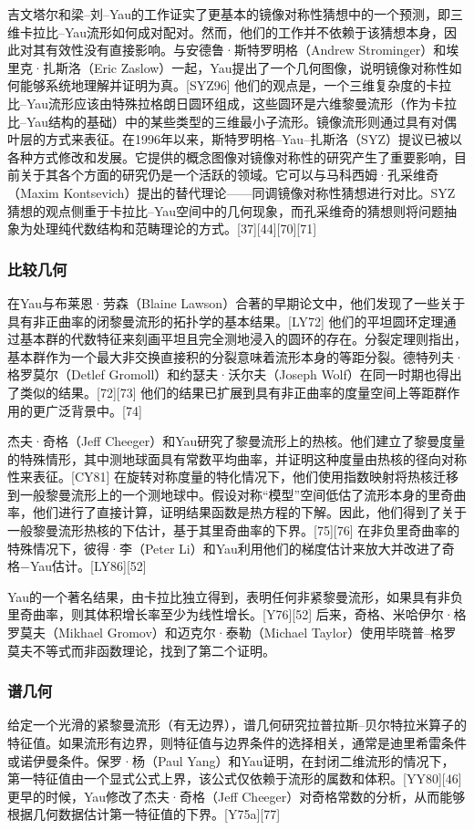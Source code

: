 吉文塔尔和梁–刘–Yau的工作证实了更基本的镜像对称性猜想中的一个预测，即三维卡拉比–Yau流形如何成对配对。然而，他们的工作并不依赖于该猜想本身，因此对其有效性没有直接影响。与安德鲁·斯特罗明格（Andrew Strominger）和埃里克·扎斯洛（Eric Zaslow）一起，Yau提出了一个几何图像，说明镜像对称性如何能够系统地理解并证明为真。[SYZ96] 他们的观点是，一个三维复杂度的卡拉比–Yau流形应该由特殊拉格朗日圆环组成，这些圆环是六维黎曼流形（作为卡拉比–Yau结构的基础）中的某些类型的三维最小子流形。镜像流形则通过具有对偶叶层的方式来表征。在1996年以来，斯特罗明格–Yau–扎斯洛（SYZ）提议已被以各种方式修改和发展。它提供的概念图像对镜像对称性的研究产生了重要影响，目前关于其各个方面的研究仍是一个活跃的领域。它可以与马科西姆·孔采维奇（Maxim Kontsevich）提出的替代理论——同调镜像对称性猜想进行对比。SYZ猜想的观点侧重于卡拉比–Yau空间中的几何现象，而孔采维奇的猜想则将问题抽象为处理纯代数结构和范畴理论的方式。[37][44][70][71]
\subsubsection{比较几何}
在Yau与布莱恩·劳森（Blaine Lawson）合著的早期论文中，他们发现了一些关于具有非正曲率的闭黎曼流形的拓扑学的基本结果。[LY72] 他们的平坦圆环定理通过基本群的代数特征来刻画平坦且完全测地浸入的圆环的存在。分裂定理则指出，基本群作为一个最大非交换直接积的分裂意味着流形本身的等距分裂。德特列夫·格罗莫尔（Detlef Gromoll）和约瑟夫·沃尔夫（Joseph Wolf）在同一时期也得出了类似的结果。[72][73] 他们的结果已扩展到具有非正曲率的度量空间上等距群作用的更广泛背景中。[74]

杰夫·奇格（Jeff Cheeger）和Yau研究了黎曼流形上的热核。他们建立了黎曼度量的特殊情形，其中测地球面具有常数平均曲率，并证明这种度量由热核的径向对称性来表征。[CY81] 在旋转对称度量的特化情况下，他们使用指数映射将热核迁移到一般黎曼流形上的一个测地球中。假设对称“模型”空间低估了流形本身的里奇曲率，他们进行了直接计算，证明结果函数是热方程的下解。因此，他们得到了关于一般黎曼流形热核的下估计，基于其里奇曲率的下界。[75][76] 在非负里奇曲率的特殊情况下，彼得·李（Peter Li）和Yau利用他们的梯度估计来放大并改进了奇格−Yau估计。[LY86][52]

Yau的一个著名结果，由卡拉比独立得到，表明任何非紧黎曼流形，如果具有非负里奇曲率，则其体积增长率至少为线性增长。[Y76][52] 后来，奇格、米哈伊尔·格罗莫夫（Mikhael Gromov）和迈克尔·泰勒（Michael Taylor）使用毕晓普–格罗莫夫不等式而非函数理论，找到了第二个证明。
\subsubsection{谱几何}
给定一个光滑的紧黎曼流形（有无边界），谱几何研究拉普拉斯–贝尔特拉米算子的特征值。如果流形有边界，则特征值与边界条件的选择相关，通常是迪里希雷条件或诺伊曼条件。保罗·杨（Paul Yang）和Yau证明，在封闭二维流形的情况下，第一特征值由一个显式公式上界，该公式仅依赖于流形的属数和体积。[YY80][46] 更早的时候，Yau修改了杰夫·奇格（Jeff Cheeger）对奇格常数的分析，从而能够根据几何数据估计第一特征值的下界。[Y75a][77]

